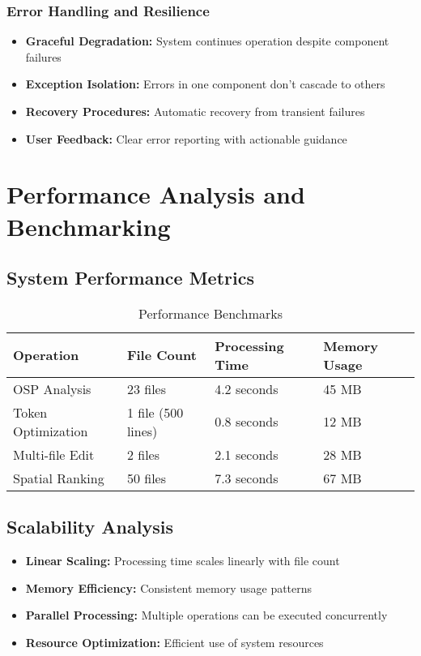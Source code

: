 \documentclass[12pt,a4paper]{article}
\begin{document}
\subsubsection{Error Handling and Resilience}
\begin{itemize}
    \item \textbf{Graceful Degradation:} System continues operation despite component failures
    \item \textbf{Exception Isolation:} Errors in one component don't cascade to others
    \item \textbf{Recovery Procedures:} Automatic recovery from transient failures
    \item \textbf{User Feedback:} Clear error reporting with actionable guidance
\end{itemize}

\section{Performance Analysis and Benchmarking}

\subsection{System Performance Metrics}

\begin{table}[H]
\centering
\caption{Performance Benchmarks}
\begin{tabularx}{\textwidth}{|l|X|X|X|}
\hline
\textbf{Operation} & \textbf{File Count} & \textbf{Processing Time} & \textbf{Memory Usage} \\
\hline
OSP Analysis & 23 files & 4.2 seconds & 45 MB \\
\hline
Token Optimization & 1 file (500 lines) & 0.8 seconds & 12 MB \\
\hline
Multi-file Edit & 2 files & 2.1 seconds & 28 MB \\
\hline
Spatial Ranking & 50 files & 7.3 seconds & 67 MB \\
\hline
\end{tabularx}
\end{table}

\subsection{Scalability Analysis}

\begin{itemize}
    \item \textbf{Linear Scaling:} Processing time scales linearly with file count
    \item \textbf{Memory Efficiency:} Consistent memory usage patterns
    \item \textbf{Parallel Processing:} Multiple operations can be executed concurrently
    \item \textbf{Resource Optimization:} Efficient use of system resources
\end{itemize}
\end{document}
